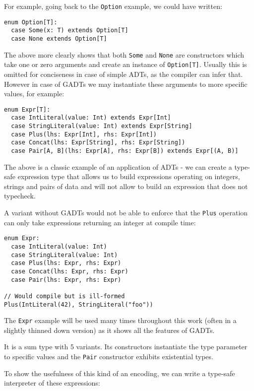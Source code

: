 For example, going back to the \texttt{Option} example, we could have written:

\begin{verbatim}
enum Option[T]:
  case Some(x: T) extends Option[T]
  case None extends Option[T]
\end{verbatim}

The above more clearly shows that both \texttt{Some} and \texttt{None} are constructors which take one or zero arguments and create an instance of \texttt{Option[T]}. Usually this is omitted for conciseness in case of simple ADTs, as the compiler can infer that. However in case of GADTs we may instantiate these arguments to more specific values, for example:

\begin{verbatim}
enum Expr[T]:
  case IntLiteral(value: Int) extends Expr[Int]
  case StringLiteral(value: Int) extends Expr[String]
  case Plus(lhs: Expr[Int], rhs: Expr[Int])
  case Concat(lhs: Expr[String], rhs: Expr[String])
  case Pair[A, B](lhs: Expr[A], rhs: Expr[B]) extends Expr[(A, B)]
\end{verbatim}

The above is a classic example of an application of ADTs - we can create a type-safe expression type that allows us to build expressions operating on integers, strings and pairs of data and will not allow to build an expression that does not typecheck.

A variant without GADTs would not be able to enforce that the \texttt{Plus} operation can only take expressions returning an integer at compile time:

\begin{verbatim}
enum Expr:
  case IntLiteral(value: Int)
  case StringLiteral(value: Int)
  case Plus(lhs: Expr, rhs: Expr)
  case Concat(lhs: Expr, rhs: Expr)
  case Pair(lhs: Expr, rhs: Expr)
  
// Would compile but is ill-formed
Plus(IntLiteral(42), StringLiteral("foo"))
\end{verbatim}

The \texttt{Expr} example will be used many times throughout this work (often in a slightly thinned down version) as it shows all the features of GADTs.

It is a sum type with 5 variants. Its constructors instantiate the type parameter to specific values and the \texttt{Pair} constructor exhibits existential types.

To show the usefulness of this kind of an encoding, we can write a type-safe interpreter of these expressions:

